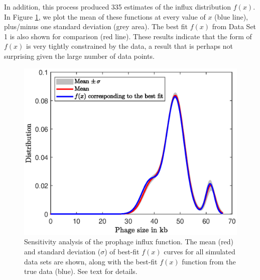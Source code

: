 In addition, this process produced 335 estimates of the influx distribution $f(x)$.  In Figure \ref{fig:sens_f}, we plot the mean of these functions at every value of $x$ (blue line), plus/minus one standard deviation (grey area).  The best fit $f(x)$ from Data Set 1 is also shown for comparison (red line).  These results indicate that the form of $f(x)$ is very tightly constrained by the data, a result that is perhaps not surprising given the large number of data points.

\begin{figure}[H]\centering
\includegraphics[scale=0.7]{f_sens.eps}

\caption[Sensitivity analysis of the prophage influx function.]{Sensitivity analysis of the prophage influx function.  The mean (red) and standard deviation ($\sigma$) of best-fit $f(x)$ curves for all simulated data sets are shown, along with the best-fit $f(x)$ function from the true data (blue).  See text for details.}
\label{fig:sens_f}
\end{figure}

